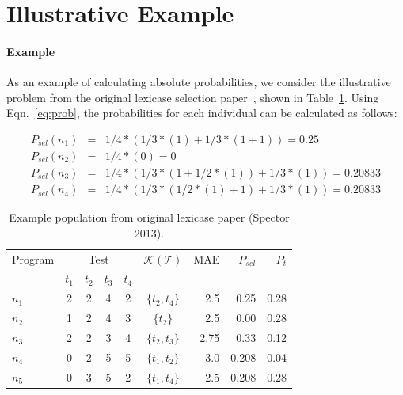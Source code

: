 \documentclass[preprint]{article}
\begin{document}
\section{Illustrative Example}
\paragraph{Example}
As an example of calculating absolute probabilities, we consider the illustrative problem from the original lexicase selection paper~\cite{spector_assessment_2013}, shown in Table~\ref{tbl:ex}. Using Eqn.~\ref{eq:prob}, the probabilities for each individual can be calculated as follows:

\begin{align*}
P_{sel}(n_1) &=& 1/4*(1/3*(1)+1/3*(1+1)) = 0.25 \\
P_{sel}(n_2) &=& 1/4*(0) = 0 \\
P_{sel}(n_3) &=&1/4*(1/3*(1+1/2*(1))+1/3*(1)) = 0.20833 \\
P_{sel}(n_4) &=& 1/4*(1/3*(1/2*(1)+1)+1/3*(1)) = 0.20833 
\end{align*}

\begin{table}
\centering
\caption{Example population from original lexicase paper (Spector 2013).}\label{tbl:ex}
\begin{tabular}{l|cccc|c|r|rr}
Program & \multicolumn{4}{c}{Test} & $\mathcal{K}(\mathcal{T})$ & MAE & $P_{sel}$ & $P_{t}$\\
& $t_1$ & $t_2$ & $t_3$ & $t_4$ & \\ \hline
$n_1$ & 2 & 2 & 4 & 2 & $\{t_2,t_4\}$ &	2.5		&	0.25 	& 	0.28	\\
$n_2$ & 1 & 2 & 4 & 3 & $\{t_2\}$		&	2.5		&	0.00	&	0.28	\\
$n_3$ & 2 & 2 & 3 & 4 & $\{t_2,t_3\}$ &	2.75	& 	0.33	&	0.12	\\
$n_4$ & 0 & 2 & 5 & 5 & $\{t_1,t_2\}$ &	3.0		& 	0.208	&	0.04	\\
$n_5$ & 0 & 3 & 5 & 2 & $\{t_1,t_4\}$ &	2.5		&	0.208	&	0.28
\end{tabular}
\end{table}
\end{document}
